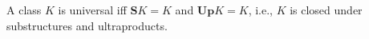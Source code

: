 A class $K$ is universal iff $\mathbf{S}K = K$ and $\mathbf{Up}K = K$, i.e., $K$ is closed under substructures and ultraproducts.
